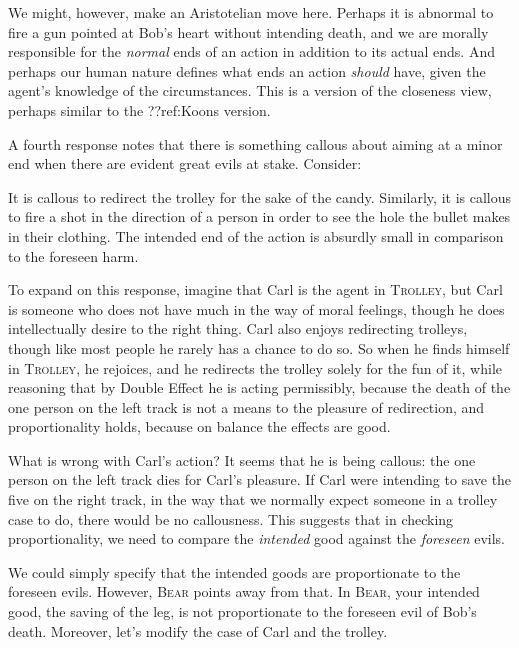 We might, however, make an Aristotelian move here. Perhaps it is abnormal to fire a gun pointed at Bob's heart without intending
death, and we are morally responsible for the \textit{normal} ends of an action in addition to its actual ends. And perhaps
our human nature defines what ends an action \textit{should} have, given the agent's knowledge of the circumstances.
This is a version of the closeness view, perhaps similar to the ??ref:Koons version. 

A fourth response notes that there is something callous about aiming at a minor end when there are evident great evils at stake. Consider:

It is callous to redirect the trolley for the sake of the candy. Similarly,
it is callous to fire a shot in the direction of a person in order to see the hole the bullet makes in their clothing. The intended 
end of the action is absurdly small in comparison to the foreseen harm. 

To expand on this response, imagine that Carl is the agent in \textsc{Trolley}, but Carl is someone who does not have much
in the way of moral feelings, though he does intellectually desire to the right thing. Carl also enjoys redirecting trolleys, 
though like most people he rarely has a chance to do so. So when he finds himself in \textsc{Trolley}, he rejoices, and he
redirects the trolley solely for the fun of it, while reasoning that by Double Effect he is acting permissibly, because the
death of the one person on the left track is not a means to the pleasure of redirection, and proportionality holds, because
on balance the effects are good. 

What is wrong with Carl's action? It seems that he is being callous: the one person on the left track dies for Carl's pleasure.
If Carl were intending to save the five on the right track, in the way that we normally expect someone in a trolley case to do, 
there would be no callousness. This suggests that in checking proportionality, we need to compare the \textit{intended} good 
against the \textit{foreseen} evils. 

We could simply specify that the intended goods are proportionate to the foreseen evils. However, \textsc{Bear} points away 
from that. In \textsc{Bear}, your intended good, the saving of the leg, is not proportionate to the foreseen evil of Bob's 
death. Moreover, let's modify the case of Carl and the trolley. 

